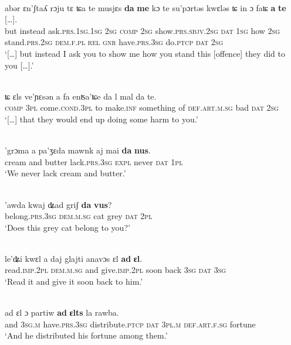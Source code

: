{\ea\label{gart1}
\\
\gll abər ɛn'ʃtaʎ rɔju tɛ ʨa te musjɛs \textbf{da} \textbf{me} kɔ te su'pɔrtəs kwɛləs ʨ in ɔ faʨ \textbf{a} \textbf{te} […].\\
     but instead ask.\textsc{prs.1sg.1sg} \textsc{2sg} \textsc{comp} \textsc{2sg} show.\textsc{prs.sbjv.2sg} \textsc{dat} \textsc{1sg} how \textsc{2sg} stand.\textsc{prs.2sg} \textsc{dem.f.pl} \textsc{rel} \textsc{gnr} have.\textsc{prs.3sg} do.\textsc{ptcp} \textsc{dat} \textsc{2sg}\\
\glt `[…] but instead I ask you to show me how you stand this [offence] they did to you […].'
\z
 
 \ea\label{}
\\
\gll  […] ʨ ɛls ve'ɲɛsən a fa enʦa'ʨe da l mal da te.\\
     […]  \textsc{comp} \textsc{3pl} come.\textsc{cond.3pl} to make.\textsc{inf} something of \textsc{def.art.m.sg} bad \textsc{dat} \textsc{2sg}\\
\glt `[…] that they would end up doing some harm to you.'
\z

\ea\label{}
\\
\gll 'grɔma a pa'ʒɛda mawnk aj mai \textbf{da} \textbf{nus}.\\
     cream and butter lack.\textsc{prs.3sg} \textsc{expl} never \textsc{dat} \textsc{1pl}\\
\glt `We never lack cream and butter.'
\z


\ea\label{}
\\
\gll 'awda kwaj ʥad griʃ \textbf{da} \textbf{vus}?\\
     belong.\textsc{prs.3sg} \textsc{dem.m.sg} cat grey \textsc{dat} \textsc{2pl}\\
\glt `Does this grey cat belong to you?'
\z


\ea\label{}
\\
\gll le'ʥi kwɛl a daj glajti anavɔs ɛl \textbf{ad} \textbf{ɛl}.\\
     read.\textsc{imp.2pl} \textsc{dem.m.sg} and give.\textsc{imp.2pl} soon back \textsc{3sg} \textsc{dat} \textsc{3sg}\\
\glt `Read it and give it soon back to him.'
\z

 
\ea\label{}
\\
\gll ad ɛl ɔ partiw \textbf{ad} \textbf{ɛlts} la rawba.\\
     and \textsc{3sg.m} have.\textsc{prs.3sg} distribute.\textsc{ptcp} \textsc{dat} \textsc{3pl.m} \textsc{def.art.f.sg} fortune\\
\glt `And he distributed his fortune among them.'
\z

}
